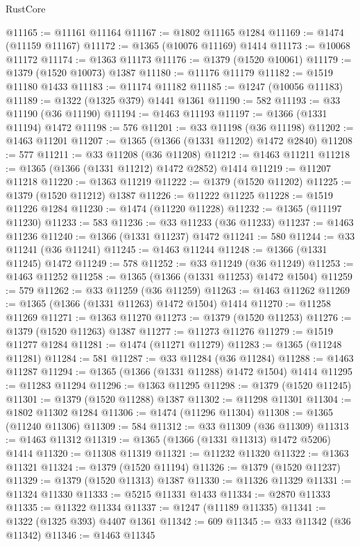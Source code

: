 \begin{lexlean}{RustCore}
\begin{coremodule}
@11165 := @11161 @11164
@11167 := @1802 @11165 @1284
@11169 := @1474 (@11159 @11167)
@11172 := @1365 (@10076 @11169) @1414
@11173 := @10068 @11172
@11174 := @1363 @11173
@11176 := @1379 (@1520 @10061)
@11179 := @1379 (@1520 @10073) @1387
@11180 := @11176 @11179
@11182 := @1519 @11180 @1433
@11183 := @11174 @11182
@11185 := @1247 (@10056 @11183)
@11189 := @1322 (@1325 @379) @1441 @1361
@11190 := 582
@11193 := @33 @11190 (@36 @11190)
@11194 := @1463 @11193
@11197 := @1366 (@1331 @11194) @1472
@11198 := 576
@11201 := @33 @11198 (@36 @11198)
@11202 := @1463 @11201
@11207 := @1365 (@1366 (@1331 @11202) @1472 @2840)
@11208 := 577
@11211 := @33 @11208 (@36 @11208)
@11212 := @1463 @11211
@11218 := @1365 (@1366 (@1331 @11212) @1472 @2852) @1414
@11219 := @11207 @11218
@11220 := @1363 @11219
@11222 := @1379 (@1520 @11202)
@11225 := @1379 (@1520 @11212) @1387
@11226 := @11222 @11225
@11228 := @1519 @11226 @1284
@11230 := @1474 (@11220 @11228)
@11232 := @1365 (@11197 @11230)
@11233 := 583
@11236 := @33 @11233 (@36 @11233)
@11237 := @1463 @11236
@11240 := @1366 (@1331 @11237) @1472
@11241 := 580
@11244 := @33 @11241 (@36 @11241)
@11245 := @1463 @11244
@11248 := @1366 (@1331 @11245) @1472
@11249 := 578
@11252 := @33 @11249 (@36 @11249)
@11253 := @1463 @11252
@11258 := @1365 (@1366 (@1331 @11253) @1472 @1504)
@11259 := 579
@11262 := @33 @11259 (@36 @11259)
@11263 := @1463 @11262
@11269 := @1365 (@1366 (@1331 @11263) @1472 @1504) @1414
@11270 := @11258 @11269
@11271 := @1363 @11270
@11273 := @1379 (@1520 @11253)
@11276 := @1379 (@1520 @11263) @1387
@11277 := @11273 @11276
@11279 := @1519 @11277 @1284
@11281 := @1474 (@11271 @11279)
@11283 := @1365 (@11248 @11281)
@11284 := 581
@11287 := @33 @11284 (@36 @11284)
@11288 := @1463 @11287
@11294 := @1365 (@1366 (@1331 @11288) @1472 @1504) @1414
@11295 := @11283 @11294
@11296 := @1363 @11295
@11298 := @1379 (@1520 @11245)
@11301 := @1379 (@1520 @11288) @1387
@11302 := @11298 @11301
@11304 := @1802 @11302 @1284
@11306 := @1474 (@11296 @11304)
@11308 := @1365 (@11240 @11306)
@11309 := 584
@11312 := @33 @11309 (@36 @11309)
@11313 := @1463 @11312
@11319 := @1365 (@1366 (@1331 @11313) @1472 @5206) @1414
@11320 := @11308 @11319
@11321 := @11232 @11320
@11322 := @1363 @11321
@11324 := @1379 (@1520 @11194)
@11326 := @1379 (@1520 @11237)
@11329 := @1379 (@1520 @11313) @1387
@11330 := @11326 @11329
@11331 := @11324 @11330
@11333 := @5215 @11331 @1433
@11334 := @2870 @11333
@11335 := @11322 @11334
@11337 := @1247 (@11189 @11335)
@11341 := @1322 (@1325 @393) @4407 @1361
@11342 := 609
@11345 := @33 @11342 (@36 @11342)
@11346 := @1463 @11345

\end{coremodule}
\end{lexlean}
